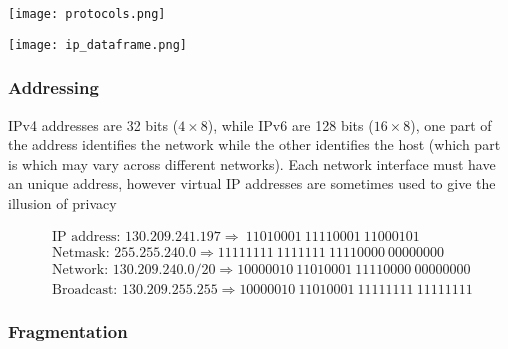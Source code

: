 			\texttt{[image: protocols.png]}

			\texttt{[image: ip\_dataframe.png]}

	
	\subsubsection{Addressing}

		\par{IPv4 addresses are 32 bits ($4\times8$), while IPv6 are 128 bits ($16\times8$), one part of the address identifies the network while the other identifies the host (which part is which may vary across different networks). Each network interface must have an unique address, however virtual IP addresses are sometimes used to give the illusion of privacy}


	


			$$
			\begin{array}{l}
			\text { IP address: } 130.209 .241 .197 \Rightarrow  \ 11010001 \ 11110001 \ 11000101 \\ 
			\text { Netmask: } 255.255 .240 .0 \Rightarrow11111111 \ 1111111 \ 11110000 \ 00000000 \\ 
			\text { Network: }130.209 .240 .0 / 20 \Rightarrow 10000010 \ 11010001 \ 11110000 \ 00000000 \\ 
			\text { Broadcast: } 130.209 .255 .255 \Rightarrow 10000010 \ 11010001 \ 11111111 \ 11111111
			\end{array}
			$$


	\subsubsection{Fragmentation}


